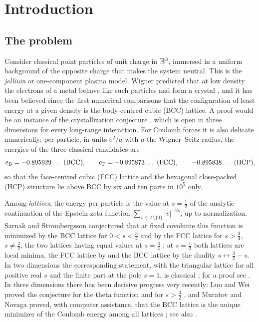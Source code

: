 \section{Introduction}\label{sec:intro}

\subsection{The problem}

Consider classical point particles of unit charge in $\mathbb R^3$, immersed in a uniform background of the opposite charge that makes the
system neutral. This is the \emph{jellium} or one-component plasma model. Wigner predicted that at low density the electrons of a
metal behave like such particles and form a crystal \cite{Wigner1934,Wigner1938}, and it has been believed since the first numerical
comparisons \cite{Fuchs1935} that the configuration of least energy at a given density is the body-centred cubic (BCC) lattice. A
proof would be an instance of the crystallization conjecture \cite{BlancLewin2015,Lewin2022}, which is open in three dimensions for
every long-range interaction. For Coulomb forces it is also delicate numerically: per particle, in units $e^2/a$ with $a$ the
Wigner--Seitz radius, the energies of the three classical candidates are \cite{BaikoPotekhinYakovlev2001}
\[
  \eB=-0.895929\ldots\ \text{(BCC)},\qquad \eF=-0.895873\ldots\ \text{(FCC)},\qquad -0.895838\ldots\ \text{(HCP)},
\]
so that the face-centred cubic (FCC) lattice and the hexagonal close-packed (HCP) structure lie above BCC by six and ten parts in
$10^5$ only.

Among \emph{lattices}, the energy per particle is the value at $s=\frac12$ of the analytic continuation of the Epstein zeta function
$\sum_{v\in\Lambda\setminus\{0\}}|v|^{-2s}$, up to normalization. Sarnak and Str\"ombergsson conjectured that at fixed covolume this
function is minimized by the BCC lattice for $0<s<\frac34$ and by the FCC lattice for $s>\frac34$, $s\ne\frac32$, the two lattices
having equal values at $s=\frac34$ \cite{SarnakStrombergsson2006}; at $s=\frac12$ both lattices are local minima, the FCC lattice by
\cite{Ennola1964Cambridge} and the BCC lattice by the duality $s\leftrightarrow\frac32-s$. In two dimensions the corresponding statement,
with the triangular lattice for all positive real $s$ and the finite part at the pole $s=1$, is classical
\cite{Rankin1953,Cassels1959,Ennola1964Glasgow,Diananda1964}; for a proof see \cite[Theorem~1 and the paragraph after it]{Montgomery1988}.
In three dimensions there has been decisive progress very recently: Luo and Wei proved the conjecture for the theta function and for
$s>\frac32$ \cite{LuoWei2026SS}, and Muratov and Novaga proved, with computer assistance, that the BCC lattice is the unique minimizer
of the Coulomb energy among all lattices \cite{MuratovNovaga2026}; see also \cite{LuoWei2026Yukawa}.

